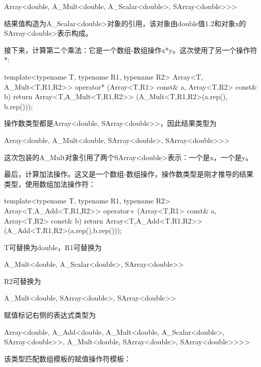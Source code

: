 \begin{cpp}
Array<double, A_Mult<double, A_Scalar<double>, SArray<double>>>
\end{cpp}

结果值构造为A\_Scalar<double>对象的引用，该对象由double值1.2和对象x的SArray<double>表示构成。

接下来，计算第二个乘法：它是一个数组-数组操作x*y。这次使用了另一个操作符*:

\begin{cpp}
template<typename T, typename R1, typename R2>
Array<T, A_Mult<T,R1,R2>>
operator* (Array<T,R1> const& a, Array<T,R2> const& b) {
	return Array<T,A_Mult<T,R1,R2>>
		(A_Mult<T,R1,R2>(a.rep(), b.rep()));
}
\end{cpp}

操作数类型都是Array<double, SArray<double>{}>，因此结果类型为

\begin{cpp}
Array<double, A_Mult<double, SArray<double>, SArray<double>>>
\end{cpp}

这次包装的A\_Mult对象引用了两个SArray<double>表示：一个是x，一个是y。

最后，计算加法操作。这又是一个数组-数组操作，操作数类型是刚才推导的结果类型，使用数组加法操作符：

\begin{cpp}
template<typename T, typename R1, typename R2>
Array<T,A_Add<T,R1,R2>>
operator+ (Array<T,R1> const& a, Array<T,R2> const& b) {
	return Array<T,A_Add<T,R1,R2>>
		(A_Add<T,R1,R2>(a.rep(),b.rep()));
}
\end{cpp}

T可替换为double，R1可替换为

\begin{cpp}
A_Mult<double, A_Scalar<double>, SArray<double>>
\end{cpp}

R2可替换为

\begin{cpp}
A_Mult<double, SArray<double>, SArray<double>>
\end{cpp}

赋值标记右侧的表达式类型为

\begin{cpp}
Array<double,
	A_Add<double,
		A_Mult<double, A_Scalar<double>, SArray<double>>,
		A_Mult<double, SArray<double>, SArray<double>>>>
\end{cpp}

该类型匹配数组模板的赋值操作符模板：

